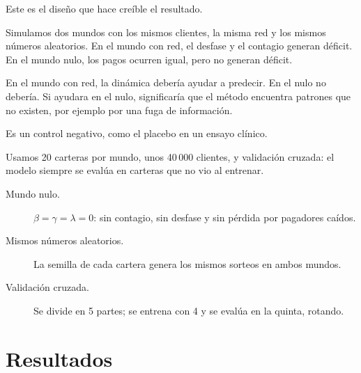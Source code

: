 \begin{decir}
Este es el diseño que hace creíble el resultado.

Simulamos dos mundos con los mismos clientes, la misma red y los mismos números
aleatorios. En el mundo con red, el desfase y el contagio generan déficit. En el mundo
nulo, los pagos ocurren igual, pero no generan déficit.

En el mundo con red, la dinámica debería ayudar a predecir. En el nulo no debería. Si
ayudara en el nulo, significaría que el método encuentra patrones que no existen, por
ejemplo por una fuga de información.

Es un control negativo, como el placebo en un ensayo clínico.

Usamos 20 carteras por mundo, unos 40\,000 clientes, y validación cruzada: el modelo
siempre se evalúa en carteras que no vio al entrenar.
\end{decir}
\begin{terminos}
\begin{description}
\item[Mundo nulo.] $\beta=\gamma=\lambda=0$: sin contagio, sin desfase y sin pérdida por
pagadores caídos.
\item[Mismos números aleatorios.] La semilla de cada cartera genera los mismos sorteos en
ambos mundos.
\item[Validación cruzada.] Se divide en 5 partes; se entrena con 4 y se evalúa en la
quinta, rotando.
\end{description}
\end{terminos}

\section{Resultados}

